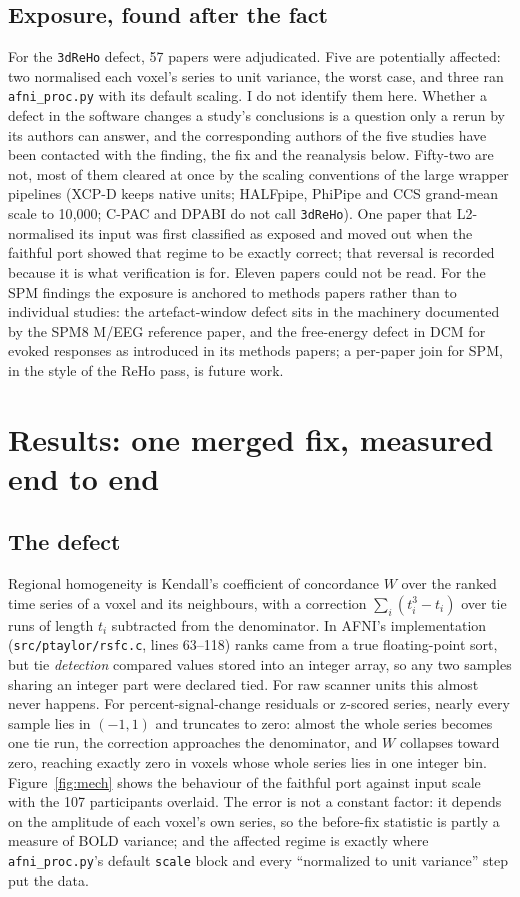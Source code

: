 \documentclass[11pt]{article}
\newcommand{\code}[1]{\texttt{#1}}
\begin{document}
\subsection{Exposure, found after the fact}
For the \code{3dReHo} defect, 57 papers were adjudicated. Five are potentially affected: two normalised each voxel's series to unit variance, the worst case, and three ran \code{afni\_proc.py} with its default scaling. I do not identify them here. Whether a defect in the software changes a study's conclusions is a question only a rerun by its authors can answer, and the corresponding authors of the five studies have been contacted with the finding, the fix and the reanalysis below. Fifty-two are not, most of them cleared at once by the scaling conventions of the large wrapper pipelines (XCP-D keeps native units; HALFpipe, PhiPipe and CCS grand-mean scale to 10{,}000; C-PAC and DPABI do not call \code{3dReHo}). One paper that L2-normalised its input was first classified as exposed and moved out when the faithful port showed that regime to be exactly correct; that reversal is recorded because it is what verification is for. Eleven papers could not be read. For the SPM findings the exposure is anchored to methods papers rather than to individual studies: the artefact-window defect sits in the machinery documented by the SPM8 M/EEG reference paper, and the free-energy defect in DCM for evoked responses as introduced in its methods papers; a per-paper join for SPM, in the style of the ReHo pass, is future work.


\section{Results: one merged fix, measured end to end}
\label{sec:reho}
\subsection{The defect}
Regional homogeneity \cite{zang2004} is Kendall's coefficient of concordance $W$ over the ranked time series of a voxel and its neighbours, with a correction $\sum_i (t_i^3 - t_i)$ over tie runs of length $t_i$ subtracted from the denominator. In AFNI's implementation \cite{taylor2013} (\code{src/ptaylor/rsfc.c}, lines 63--118) ranks came from a true floating-point sort, but tie \emph{detection} compared values stored into an integer array, so any two samples sharing an integer part were declared tied. For raw scanner units this almost never happens. For percent-signal-change residuals or z-scored series, nearly every sample lies in $(-1, 1)$ and truncates to zero: almost the whole series becomes one tie run, the correction approaches the denominator, and $W$ collapses toward zero, reaching exactly zero in voxels whose whole series lies in one integer bin. Figure~\ref{fig:mech} shows the behaviour of the faithful port against input scale with the 107 participants overlaid. The error is not a constant factor: it depends on the amplitude of each voxel's own series, so the before-fix statistic is partly a measure of BOLD variance; and the affected regime is exactly where \code{afni\_proc.py}'s default \code{scale} block and every ``normalized to unit variance'' step put the data.
\end{document}
